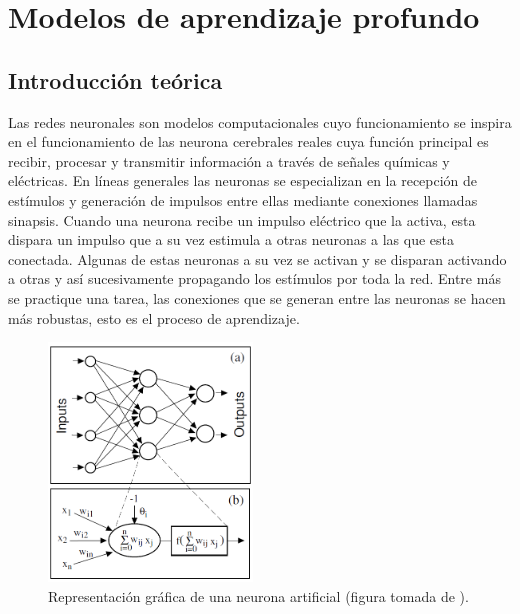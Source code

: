 \chapter{Modelos de aprendizaje profundo}
\label{capitulo 3}

\section{Introducción teórica}

Las redes neuronales son modelos computacionales cuyo funcionamiento se inspira en el funcionamiento de las 
neurona cerebrales reales cuya función principal es recibir, procesar y transmitir información a través de señales
químicas y eléctricas. En líneas generales las neuronas se especializan en la recepción de estímulos y generación
de impulsos entre ellas mediante conexiones llamadas sinapsis. Cuando una neurona recibe un impulso 
eléctrico que la activa, esta dispara un impulso que a su vez estimula a otras neuronas a las que esta conectada. 
Algunas de estas neuronas a su vez se activan y se disparan activando a otras y así sucesivamente 
propagando los estímulos por toda la red. Entre más se practique una tarea, las conexiones que se generan entre las 
neuronas se hacen más robustas, esto es el proceso de aprendizaje. 

\begin{figure}[h!]
    \begin{center}
      \includegraphics[height=2.5in]{Figures/esquema_red.PNG}
      \caption{ Representación gráfica de una neurona artificial (figura tomada de \cite{gutierrez}). }
      \label{perceptron}
    \end{center}
  \end{figure}

